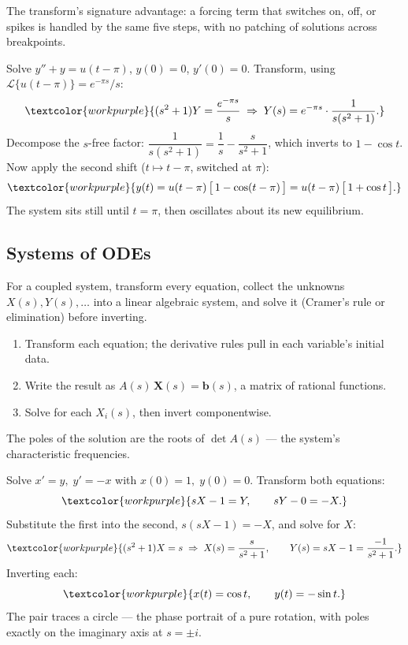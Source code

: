 The transform's signature advantage: a forcing term that switches on, off, or spikes
is handled by the same five steps, with no patching of solutions across breakpoints.

\begin{examplebox}
Solve $y'' + y = u(t-\pi)$, $y(0)=0$, $y'(0)=0$. Transform, using
$\mathcal{L}\{u(t-\pi)\}=e^{-\pi s}/s$:
\[ \textcolor{workpurple}{(s^2+1)Y = \frac{e^{-\pi s}}{s}
   \;\Rightarrow\; Y(s) = e^{-\pi s}\cdot\frac{1}{s(s^2+1)}.} \]
Decompose the $s$-free factor: $\dfrac{1}{s(s^2+1)} = \dfrac{1}{s} - \dfrac{s}{s^2+1}$,
which inverts to $1-\cos t$. Now apply the second shift ($t\mapsto t-\pi$, switched at
$\pi$):
\[ \textcolor{workpurple}{y(t) = u(t-\pi)\,\big[\,1 - \cos(t-\pi)\,\big]
   = u(t-\pi)\,\big[\,1 + \cos t\,\big].} \]
The system sits still until $t=\pi$, then oscillates about its new equilibrium.
\end{examplebox}

\subsection{Systems of ODEs}

For a coupled system, transform every equation, collect the unknowns
$X(s), Y(s),\dots$ into a linear algebraic system, and solve it (Cramer's rule or
elimination) before inverting.

\begin{methodbox}
\begin{enumerate}
    \item Transform each equation; the derivative rules pull in each variable's
          initial data.
    \item Write the result as $A(s)\,\mathbf{X}(s) = \mathbf{b}(s)$, a matrix of
          rational functions.
    \item Solve for each $X_i(s)$, then invert componentwise.
\end{enumerate}
The poles of the solution are the roots of $\det A(s)$ --- the system's
characteristic frequencies.
\end{methodbox}

\begin{examplebox}
Solve $x' = y,\; y' = -x$ with $x(0)=1,\; y(0)=0$. Transform both equations:
\[ \textcolor{workpurple}{sX - 1 = Y, \qquad sY - 0 = -X.} \]
Substitute the first into the second, $s(sX-1) = -X$, and solve for $X$:
\[ \textcolor{workpurple}{(s^2+1)X = s \;\Rightarrow\; X(s) = \frac{s}{s^2+1},
   \qquad Y(s) = sX - 1 = \frac{-1}{s^2+1}.} \]
Inverting each:
\[ \textcolor{workpurple}{x(t) = \cos t, \qquad y(t) = -\sin t.} \]
The pair traces a circle --- the phase portrait of a pure rotation, with poles
exactly on the imaginary axis at $s=\pm i$.
\end{examplebox}

